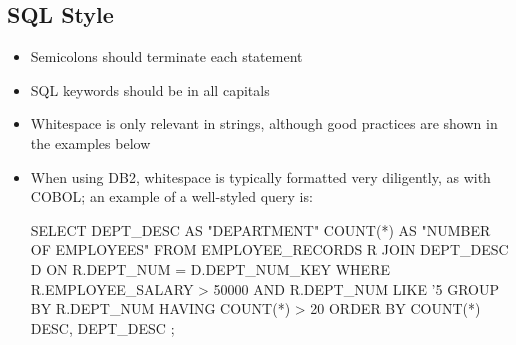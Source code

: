 \documentclass[a4paper]{article}
\begin{document}
\subsection{SQL Style}
\begin{itemize}
    \item Semicolons should terminate each statement
    \item SQL keywords should be in all capitals
    \item Whitespace is only relevant in strings, although good practices are shown in the examples below
    \item When using DB2, whitespace is typically formatted very diligently, as with COBOL; an example of a well-styled query is:
\begin{sql}
SELECT DEPT_DESC AS "DEPARTMENT"
       COUNT(*)  AS "NUMBER OF EMPLOYEES"
  FROM EMPLOYEE_RECORDS R
       JOIN DEPT_DESC D
         ON R.DEPT_NUM = D.DEPT_NUM_KEY
 WHERE R.EMPLOYEE_SALARY > 50000
   AND R.DEPT_NUM LIKE '5%
 GROUP BY R.DEPT_NUM
HAVING COUNT(*) > 20
 ORDER BY COUNT(*) DESC, DEPT_DESC
;
\end{sql}
\end{itemize}
\end{document}
